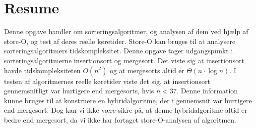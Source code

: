 \chapter*{Resume}
\label{ch:Resume}

Denne opgave handler om sorteringsalgoritmer, og analysen af dem ved hjælp af store-O, og test af deres reelle køretider. Store-O kan bruges til at analysere sorteringsalgoritmers tidskompleksitet. Denne opgave tager udgangspunkt i sorteringsalgoritmerne insertionsort og mergesort. Det viste sig at insertionsort havde tidskompleksiteten $O(n^2)$ og at mergesorts altid er $\Theta (n \cdot \log n)$. I testen af algoritmernes reelle køretider viste det sig, at insertionsort gennemsnitligt var hurtigere end mergesorts, hvis $n < 37$. Denne information kunne bruges til at konstruere en hybridalgoritme, der i gennemsnit var hurtigere end mergesort. Dog kan vi ikke være sikre på, at denne hybridalgoritme altid er bedre end mergesort, da vi ikke har fortaget store-O-analysen af algoritmen.
